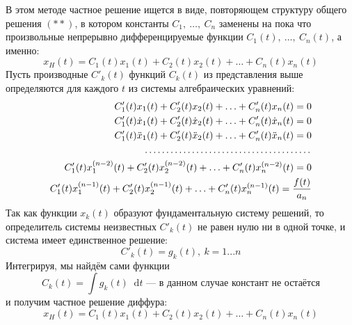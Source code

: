 \documentclass[a4paper,12pt]{article}
\newcommand{\dotffill}[1]{\parbox[t]{#1}{\dotfill}}
\renewcommand*\d{\mathop{}\!\mathrm{d}}
\newcommand{\dx}{\dot{x}}
\newcommand{\ddx}{\ddot{x}}
\newcommand{\ds}{\displaystyle}
\begin{document}
В этом методе частное решение ищется в виде, повторяющем структуру общего решения $(**)$, в котором константы $C_1,\ \ldots,\ C_n$ 	заменены на пока что произвольные непрерывно дифференцируемые функции $C_1(t),\ \ldots,\ C_n(t)$,  а именно:
\[x_H(t) = C_1(t)x_1(t) + C_2(t)x_2(t) + \ldots + C_n(t)x_n(t)\]
Пусть производные $C'_k(t)$ функций $C_k(t)$ из представления выше определяются для каждого $t$ из системы алгебраических уравнений:
\[\begin{aligned}
	C'_1(t)x_1(t) + C'_2(t)x_2(t) + \ldots + C'_n(t) x_n(t)  = 0\\
	C'_1(t)\dx_1(t) + C'_2(t)\dx_2(t) + \ldots + C'_n(t) \dx_n(t)  = 0 \\
	C'_1(t)\ddx_1(t) + C'_2(t)\ddx_2(t) + \ldots + C'_n(t) \ddx_n(t)  = 0\\
	\dotffill{0.5\textwidth}\\
	C'_1(t)x_1^{(n - 2)}(t) + C'_2(t)x_2^{(n - 2)}(t) + \ldots + C'_n(t) x_n^{(n - 2)}(t)  = 0\\
	C'_1(t)x_1^{(n - 1)}(t) + C'_2(t)x_2^{(n - 1)}(t) + \ldots + C'_n(t) x_n^{(n - 1)}(t)  = \dfrac{f(t)}{a_n}
\end{aligned}\]
Так как функции $x_k(t)$ образуют фундаментальную систему решений, то определитель системы неизвестных $C'_k(t)$ не равен нулю ни в одной точке, и система имеет единственное решение:
\[C'_k(t) = g_k(t),\ k = 1...n\]
Интегрируя, мы найдём сами функции
\[C_k(t) = \ds\int g_k(t)\d t \text{ --- в данном случае констант не остаётся}\]
и получим частное решение диффура:
\[x_H(t) = C_1(t)x_1(t) + C_2(t)x_2(t) + \ldots + C_n(t)x_n(t)\]
\end{document}
